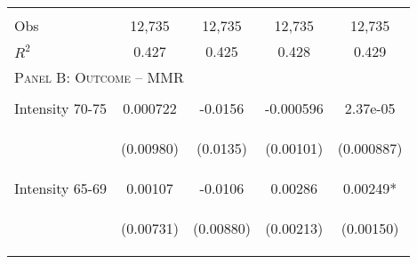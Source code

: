 \begin{subtables}
\begin{table}[htpb!]
\begin{center}
\begin{tabular}{p{5cm}cccc}
\vspace{4pt}	&	\begin{footnotesize}\end{footnotesize}	&	\begin{footnotesize}\end{footnotesize}	&	\begin{footnotesize}\end{footnotesize}	&	\begin{footnotesize}\end{footnotesize}	 \\
Obs	&	12,735	&	12,735	&	12,735	&	12,735	\\  
$R^2$	&	0.427	&	0.425	&	0.428	&	0.429	\\ \midrule
\multicolumn{5}{l}{\textsc{Panel B: Outcome – MMR}}									\\  
\vspace{4pt}	&	\begin{footnotesize}\end{footnotesize}	&	\begin{footnotesize}\end{footnotesize}	&	\begin{footnotesize}\end{footnotesize}	&	\begin{footnotesize}\end{footnotesize}	 \\
Intensity 70-75	&	0.000722	&	-0.0156	&	-0.000596	&	2.37e-05	 \\
	& \begin{footnotesize}	(0.00980)	\end{footnotesize} & \begin{footnotesize}	(0.0135)	\end{footnotesize} & \begin{footnotesize}	(0.00101)	\end{footnotesize} & \begin{footnotesize}	(0.000887)	\end{footnotesize} \\
Intensity 65-69	&	0.00107	&	-0.0106	&	0.00286	&	0.00249*	 \\
	& \begin{footnotesize}	(0.00731)	\end{footnotesize} & \begin{footnotesize}	(0.00880)	\end{footnotesize} & \begin{footnotesize}	(0.00213)	\end{footnotesize} & \begin{footnotesize}	(0.00150)	\end{footnotesize} \\

\end{tabular}
\end{center}
\end{table}
\end{subtables}
